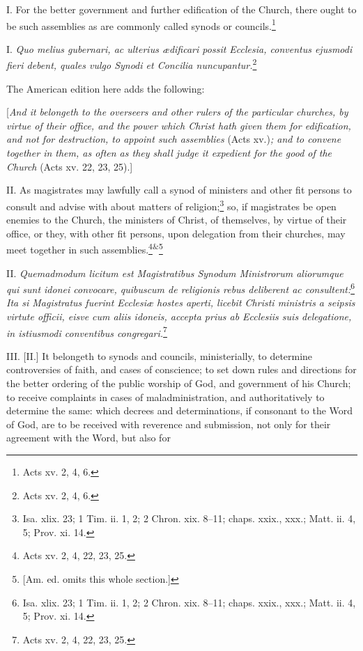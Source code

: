 I. For the better government and further edification of the Church, there ought to be such assemblies as are commonly called synods or councils.\footnote{Acts xv. 2, 4, 6.}

I. \emph{Quo melius gubernari, ac ulterius ædificari possit Ecclesia, conventus ejusmodi fieri debent, quales vulgo Synodi et Concilia nuncupantur.}\footnote{Acts xv. 2, 4, 6.}

The American edition here adds the following:

[\emph{And it belongeth to the overseers and other rulers of the particular churches, by virtue of their office, and the power which Christ hath given them for edification, and not for destruction, to appoint such assemblies }(Acts xv.)\emph{; and to convene together in them, as often as they shall judge it expedient for the good of the Church }(Acts xv. 22, 23, 25).]

II. As magistrates may lawfully call a synod of ministers and other fit persons to consult and advise with about matters of religion;\footnote{Isa. xlix. 23; 1 Tim. ii. 1, 2; 2 Chron. xix. 8–11; chaps. xxix., xxx.; Matt. ii. 4, 5; Prov. xi. 14.} so, if magistrates be open enemies to the Church, the ministers of Christ, of themselves, by virtue of their office, or they, with other fit persons, upon delegation from their churches, may meet together in such assemblies.\footnote{Acts xv. 2, 4, 22, 23, 25.}\textsuperscript{\&}\footnote{[Am. ed. omits this whole section.]}

II. \emph{Quemadmodum licitum est Magistratibus Synodum Ministrorum aliorumque qui sunt idonei convocare, quibuscum de religionis rebus deliberent ac consultent:}\footnote{Isa. xlix. 23; 1 Tim. ii. 1, 2; 2 Chron. xix. 8–11; chaps. xxix., xxx.; Matt. ii. 4, 5; Prov. xi. 14.}\emph{ Ita si Magistratus fuerint Ecclesiæ hostes aperti, licebit Christi ministris a seipsis virtute officii, eisve cum aliis idoneis, accepta prius ab Ecclesiis suis delegatione, in istiusmodi conventibus congregari.}\footnote{Acts xv. 2, 4, 22, 23, 25.}

III. [II.] It belongeth to synods and councils, ministerially, to determine controversies of faith, and cases of conscience; to set down rules and directions for the better ordering of the public worship of God, and government of his Church; to receive complaints in cases of maladministration, and authoritatively to determine the same: which decrees and determinations, if consonant to the Word of God, are to be received with reverence and submission, not only for their agreement with the Word, but also for

